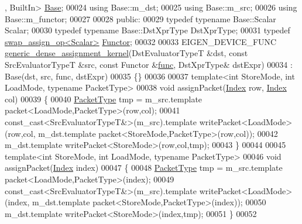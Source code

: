 \begin{DoxyCode}
      , BuiltIn> \hyperlink{class_eigen_1_1internal_1_1generic__dense__assignment__kernel}{Base};
00024   \textcolor{keyword}{using} Base::m\_dst;
00025   \textcolor{keyword}{using} Base::m\_src;
00026   \textcolor{keyword}{using} Base::m\_functor;
00027   
00028 \textcolor{keyword}{public}:
00029   \textcolor{keyword}{typedef} \textcolor{keyword}{typename} Base::Scalar Scalar;
00030   \textcolor{keyword}{typedef} \textcolor{keyword}{typename} Base::DstXprType DstXprType;
00031   \textcolor{keyword}{typedef} \hyperlink{struct_eigen_1_1internal_1_1swap__assign__op}{swap\_assign\_op<Scalar>} \hyperlink{struct_eigen_1_1internal_1_1swap__assign__op}{Functor};
00032   
00033   EIGEN\_DEVICE\_FUNC \hyperlink{class_eigen_1_1internal_1_1generic__dense__assignment__kernel}{generic\_dense\_assignment\_kernel}(DstEvaluatorTypeT &dst, \textcolor{keyword}{
      const} SrcEvaluatorTypeT &src, \textcolor{keyword}{const} Functor &\hyperlink{structfunc}{func}, DstXprType& dstExpr)
00034     : Base(dst, src, func, dstExpr)
00035   \{\}
00036   
00037   \textcolor{keyword}{template}<\textcolor{keywordtype}{int} StoreMode, \textcolor{keywordtype}{int} LoadMode, \textcolor{keyword}{typename} PacketType>
00038   \textcolor{keywordtype}{void} assignPacket(\hyperlink{namespace_eigen_a62e77e0933482dafde8fe197d9a2cfde}{Index} row, \hyperlink{namespace_eigen_a62e77e0933482dafde8fe197d9a2cfde}{Index} col)
00039   \{
00040     \hyperlink{class_eigen_1_1internal_1_1_tensor_lazy_evaluator_writable}{PacketType} tmp = m\_src.template packet<LoadMode,PacketType>(row,col);
00041     \textcolor{keyword}{const\_cast<}SrcEvaluatorTypeT&\textcolor{keyword}{>}(m\_src).\textcolor{keyword}{template} writePacket<LoadMode>(row,col, m\_dst.template 
      packet<StoreMode,PacketType>(row,col));
00042     m\_dst.template writePacket<StoreMode>(row,col,tmp);
00043   \}
00044   
00045   \textcolor{keyword}{template}<\textcolor{keywordtype}{int} StoreMode, \textcolor{keywordtype}{int} LoadMode, \textcolor{keyword}{typename} PacketType>
00046   \textcolor{keywordtype}{void} assignPacket(\hyperlink{namespace_eigen_a62e77e0933482dafde8fe197d9a2cfde}{Index} index)
00047   \{
00048     \hyperlink{class_eigen_1_1internal_1_1_tensor_lazy_evaluator_writable}{PacketType} tmp = m\_src.template packet<LoadMode,PacketType>(index);
00049     \textcolor{keyword}{const\_cast<}SrcEvaluatorTypeT&\textcolor{keyword}{>}(m\_src).\textcolor{keyword}{template} writePacket<LoadMode>(index, m\_dst.template 
      packet<StoreMode,PacketType>(index));
00050     m\_dst.template writePacket<StoreMode>(index,tmp);
00051   \}
00052   

\end{DoxyCode}
